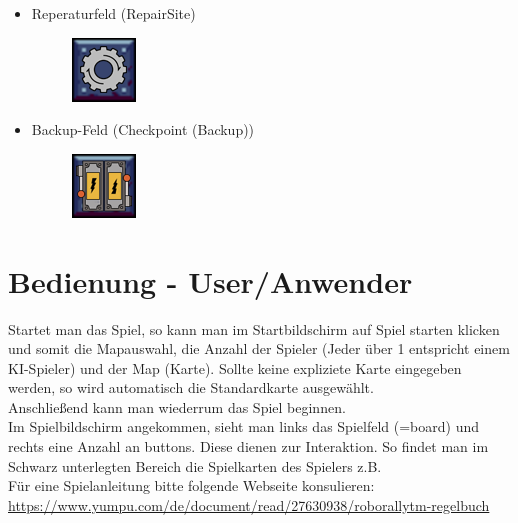 \documentclass[12pt,a4paper,oneside]{book}
\theoremstyle{plain}
\numberwithin{equation}{chapter} \DeclareMathOperator{\Var}{Var}
\begin{document}
\begin{itemize}
    \newpage
    \item Reperaturfeld (RepairSite)
    \begin{itemize}
        \begin{figure}[h]
            \centering
            \includegraphics{assets/Gear/Gear01.png}
            \label{ConveyorBelt}
        \end{figure}
    \end{itemize}
    
    \item Backup-Feld (Checkpoint (Backup))
    \begin{itemize}
        \begin{figure}[h]
            \centering
            \includegraphics{assets/Checkpoint.png}
            \label{ConveyorBelt}
        \end{figure}
    \end{itemize}
    
\end{itemize}

\chapter{Bedienung - User/Anwender}

    Startet man das Spiel, so kann man im Startbildschirm auf Spiel starten klicken und somit die Mapauswahl, die Anzahl der Spieler (Jeder über 1 entspricht einem KI-Spieler) und der Map (Karte). Sollte keine expliziete Karte eingegeben werden, so wird automatisch die Standardkarte ausgewählt. \\
    Anschließend kann man wiederrum das Spiel beginnen.\\
    Im Spielbildschirm angekommen, sieht man links das Spielfeld (=board) und rechts eine Anzahl an buttons. Diese dienen zur Interaktion. So findet man im Schwarz unterlegten Bereich die Spielkarten des Spielers z.B.\\
    Für eine Spielanleitung bitte folgende Webseite konsulieren: \\
    \hypertarget{https://www.yumpu.com/de/document/read/27630938/roborallytm-regelbuch}{\url{https://www.yumpu.com/de/document/read/27630938/roborallytm-regelbuch}}
    
\end{document}
